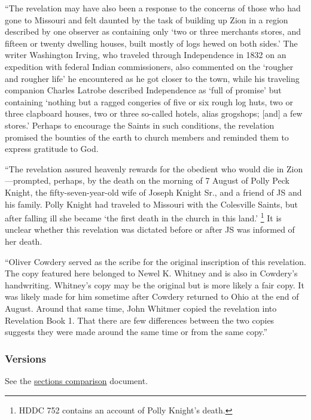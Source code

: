 			``The revelation may have also been a response to the concerns of those who had gone to Missouri and felt daunted by the task of building up Zion in a region described by one observer as containing only `two or three merchants stores, and fifteen or twenty dwelling houses, built mostly of logs hewed on both sides.' The writer Washington Irving, who traveled through Independence in 1832 on an expedition with federal Indian commissioners, also commented on the `rougher and rougher life' he encountered as he got closer to the town, while his traveling companion Charles Latrobe described Independence as `full of promise' but containing `nothing but a ragged congeries of five or six rough log huts, two or three clapboard houses, two or three so-called hotels, alias grogshops; [and] a few stores.' Perhaps to encourage the Saints in such conditions, the revelation promised the bounties of the earth to church members and reminded them to express gratitude to God.
			
			``The revelation assured heavenly rewards for the obedient who would die in Zion---prompted, perhaps, by the death on the morning of 7 August of Polly Peck Knight, the fifty-seven-year-old wife of Joseph Knight Sr., and a friend of JS and his family. Polly Knight had traveled to Missouri with the Colesville Saints, but after falling ill she became `the first death in the church in this land.'%
				\footnote{%
					HDDC 752 contains an account of Polly Knight's death.
					}
			It is unclear whether this revelation was dictated before or after JS was informed of her death.
			
			``Oliver Cowdery served as the scribe for the original inscription of this revelation. The copy featured here belonged to Newel K. Whitney and is also in Cowdery's handwriting. Whitney's copy may be the original but is more likely a fair copy. It was likely made for him sometime after Cowdery returned to Ohio at the end of August. Around that same time, John Whitmer copied the revelation into Revelation Book 1. That there are few differences between the two copies suggests they were made around the same time or from the same copy.''
		
	\subsubsection{Versions}
		\label{DC59-V}
		
		See the \href{https://drive.google.com/file/d/1goAvNz8jS4R8slYfMG_db55Ty2z_vmgK/view?usp=sharing}{sections comparison} document.
	
